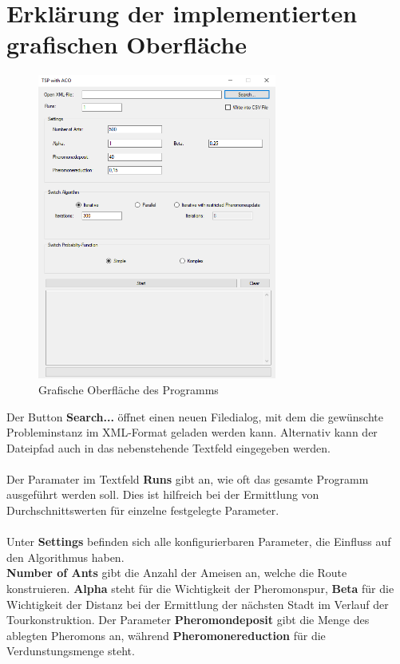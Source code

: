 \documentclass[doktyp=barbeit, sprache=german]{TUBAFarbeiten}
\begin{document}
\section{Erklärung der implementierten grafischen Oberfläche}
\begin{figure}
\captionsetup{justification=centering}
  \centering
     \includegraphics[width=0.7\textwidth]{images/TSPACOGUI.png}
  \caption{Grafische Oberfläche des Programms}
  \label{img:gui}
\end{figure}
Der Button \textbf{Search...} öffnet einen neuen Filedialog, mit dem die gewünschte Probleminstanz im XML-Format geladen werden kann. Alternativ kann der Dateipfad auch in das nebenstehende Textfeld eingegeben werden.
\\\\Der Paramater im Textfeld \textbf{Runs} gibt an, wie oft das gesamte Programm ausgeführt werden soll. Dies ist hilfreich bei der Ermittlung von Durchschnittswerten für einzelne festgelegte Parameter.
\\\\Unter \textbf{Settings} befinden sich alle konfigurierbaren Parameter, die Einfluss auf den Algorithmus haben. 
\\\textbf{Number of Ants} gibt die Anzahl der Ameisen an, welche die Route konstruieren. \textbf{Alpha} steht für die Wichtigkeit der Pheromonspur, \textbf{Beta} für die Wichtigkeit der Distanz bei der Ermittlung der nächsten Stadt im Verlauf der Tourkonstruktion. Der Parameter \textbf{Pheromondeposit} gibt die Menge des ablegten Pheromons an, während \textbf{Pheromonereduction} für die Verdunstungsmenge steht.
\end{document}
